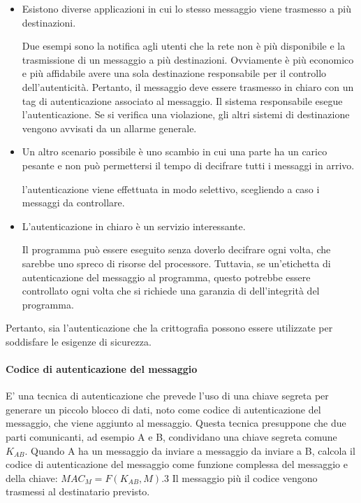 \begin{itemize}
    \item Esistono diverse applicazioni in cui lo stesso messaggio viene trasmesso a più destinazioni.
    
Due esempi sono la notifica agli utenti che la rete non è più disponibile e la trasmissione di un messaggio a più destinazioni. Ovviamente è più economico e più affidabile avere una sola destinazione responsabile per il controllo dell'autenticità. Pertanto, il messaggio deve essere trasmesso in chiaro con un tag di autenticazione associato al messaggio. Il sistema responsabile esegue l'autenticazione. Se si verifica una violazione, gli altri sistemi di destinazione vengono avvisati da un allarme generale.

    \item Un altro scenario possibile è uno scambio in cui una parte ha un carico pesante e non può permettersi il tempo di decifrare tutti i messaggi in arrivo.

l'autenticazione viene effettuata in modo selettivo, scegliendo a caso i messaggi da controllare.

    \item L'autenticazione in chiaro è un servizio interessante. 
    
Il programma può essere eseguito senza doverlo decifrare ogni volta, che sarebbe uno spreco di risorse del processore. Tuttavia, se un'etichetta di autenticazione del messaggio al programma, questo potrebbe essere controllato ogni volta che si richiede una garanzia di dell'integrità del programma.
\end{itemize}
Pertanto, sia l'autenticazione che la crittografia possono essere utilizzate per soddisfare le esigenze di sicurezza.

\singlespacing

\paragraph{Codice di autenticazione del messaggio} E' una tecnica di autenticazione che prevede l'uso di una chiave segreta per generare un piccolo blocco di dati, noto come codice di autenticazione del messaggio, che viene aggiunto al messaggio. Questa tecnica presuppone che due parti comunicanti, ad esempio A e B, condividano una chiave segreta comune $K_{AB}$. Quando A ha un messaggio da inviare a messaggio da inviare a B, calcola il codice di autenticazione del messaggio come funzione complessa del messaggio e della chiave: $MAC_M = F(K_{AB}, M)$.3 Il messaggio più il codice vengono trasmessi al destinatario previsto. 

